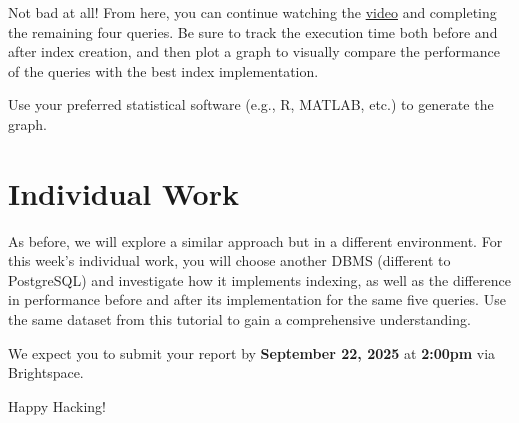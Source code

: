 \documentclass{article}
\begin{document}
Not bad at all! From here, you can continue watching the \href{https://youtu.be/clrtT_4WBAw?si=Q5Rmt7YVsykuS715}{video} and completing the remaining four queries. Be sure to track the execution time both before and after index creation, and then plot a graph to visually compare the performance of the queries with the best index implementation.

Use your preferred statistical software (e.g., R, MATLAB, etc.) to generate the graph.

\section{Individual Work}
As before, we will explore a similar approach but in a different environment. For this week's individual work, you will choose another DBMS (different to PostgreSQL) and investigate how it implements indexing, as well as the difference in performance before and after its implementation for the same five queries. Use the same dataset from this tutorial to gain a comprehensive understanding.

We expect you to submit your report by \textbf{September 22, 2025} at \textbf{2:00pm} via Brightspace\texttrademark.

\vspace{5mm}
Happy Hacking! 
\end{document}
